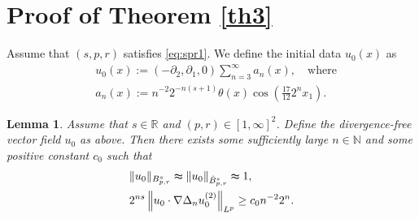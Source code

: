 \documentclass[12pt]{article}
\newtheorem{lemma}{Lemma}[section]
\newcommand{\bbal}{\begin{align*}}
\newcommand{\pa}{\partial}
\newcommand{\na}{\nabla}
\newcommand{\De}{\Delta}
\newcommand{\cd}{\cdot}
\newcommand{\R}{\mathbb{R}}
\newcommand{\f}{\left}
\newcommand{\g}{\right}
\begin{document}
\section{Proof of Theorem \ref{th3}}\label{sec4}


Assume that $(s,p,r)$ satisfies \eqref{eq:spr1}. We define the initial data $u_0(x)$ as
\bbal
&u_0(x):=\f(-\pa_2,\pa_1,0\g)\sum\limits^{\infty}_{n=3}a_n(x),  \quad\text{where}\\
& a_n(x):= n^{-2}2^{-n(s+1)}\theta(x)\cos \f(\frac{17}{12}2^{n}x_1\g).
\end{align*}

\begin{lemma}\label{ley2} Assume that $s\in \R$ and $(p,r)\in[1,\infty]^2$. Define the divergence-free vector field $u_0$ as above.
Then there exists some sufficiently large $n\in \mathbb{N}$ and some positive constant $c_0$ such that
\begin{align}
&\|u_0\|_{B^s_{p,r}}\thickapprox\|u_0\|_{\dot{B}^s_{p,r}}\thickapprox 1, \label{z1}\\
&2^{ns}\f\|u_0\cd\na \De_{n}u_0^{(2)}\g\|_{L^p}\geq c_0n^{-2}2^{n}.\label{z2}
\end{align}
\end{lemma}
\end{document}
